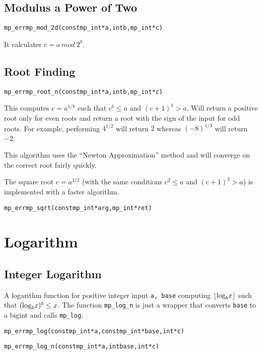 \documentclass[synpaper]{book}
\def\log{{\rm log}}
\def\mod{{\mathit\ mod\ }}
\newcommand{\floor}[1]{\left\lfloor{#1}\right\rfloor}
\begin{document}
\section{Modulus a Power of Two}
\begin{alltt}
mp_err mp_mod_2d(const mp_int *a, int b, mp_int *c)
\end{alltt}
It calculates $c = a \mod 2^b$.

\section{Root Finding}
\begin{alltt}
mp_err mp_root_n(const mp_int *a, int b, mp_int *c)
\end{alltt}
This computes $c = a^{1/b}$ such that $c^b \le a$ and $(c+1)^b > a$. Will return a positive root
only for even roots and return a root with the sign of the input for odd roots.  For example,
performing $4^{1/2}$ will return $2$ whereas $(-8)^{1/3}$ will return $-2$.

This algorithm uses the ``Newton Approximation'' method and will converge on the correct root
fairly quickly.

The square root  $c = a^{1/2}$ (with the same conditions $c^2 \le a$ and $(c+1)^2 > a$) is
implemented with a faster algorithm.

\begin{alltt}
mp_err mp_sqrt(const mp_int *arg, mp_int *ret)
\end{alltt}
\chapter{Logarithm}
\section{Integer Logarithm}
A logarithm function for positive integer input \texttt{a, base} computing  $\floor{\log_bx}$ such
that $(\log_b x)^b \le x$. The function \texttt{mp\_log\_n} is just a wrapper that converts \texttt{base}
to a bigint and calls \texttt{mp\_log}.

\begin{alltt}
mp_err mp_log(const mp_int *a, const mp_int *base, int *c)
\end{alltt}

\begin{alltt}
mp_err mp_log_n(const mp_int *a, int base, int *c)
\end{alltt}
\end{document}
